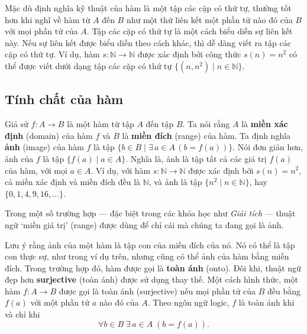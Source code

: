 Mặc dù định nghĩa kỹ thuật của hàm là một tập các cặp có thứ tự, thường tốt hơn khi nghĩ về hàm từ $A$ đến $B$ như một thứ liên kết một phần tử nào đó của $B$ với mọi phần tử của $A$. Tập các cặp có thứ tự là một cách biểu diễn sự liên kết này. Nếu sự liên kết được biểu diễn theo cách khác, thì dễ dàng viết ra tập các cặp có thứ tự. Ví dụ, hàm $s\colon \mathbb{N} \to \mathbb{N}$ được xác định bởi công thức $s(n) = n^2$ có thể được viết dưới dạng tập các cặp có thứ tự $\{(n,n^2) \mid n \in \mathbb{N}\}$.

\subsection{Tính chất của hàm}

Giả sử $f\colon A \to B$ là một hàm từ tập $A$ đến tập $B$. Ta nói rằng $A$ là \textbf{miền xác định} (domain) của hàm $f$ và $B$ là \textbf{miền đích} (range) của hàm. Ta định nghĩa \textbf{ảnh} (image) của hàm $f$ là tập $\{b \in B \mid \exists\, a \in A\, (b = f(a))\}$. Nói đơn giản hơn, ảnh của $f$ là tập $\{f(a) \mid a \in A\}$. Nghĩa là, ảnh là tập tất cả các giá trị $f(a)$ của hàm, với mọi $a \in A$. Ví dụ, với hàm $s\colon \mathbb{N} \to \mathbb{N}$ được xác định bởi $s(n) = n^2$, cả miền xác định và miền đích đều là $\mathbb{N}$, và ảnh là tập $\{n^2 \mid n \in \mathbb{N}\}$, hay $\{0, 1, 4, 9, 16, \ldots\}$.

\begin{infobox}
Trong một số trường hợp --- đặc biệt trong các khóa học như \emph{Giải tích} --- thuật ngữ `miền giá trị' (range) được dùng để chỉ cái mà chúng ta đang gọi là ảnh.
\end{infobox}

Lưu ý rằng ảnh của một hàm là tập con của miền đích của nó. Nó có thể là tập con thực sự, như trong ví dụ trên, nhưng cũng có thể ảnh của hàm bằng miền đích. Trong trường hợp đó, hàm được gọi là \textbf{toàn ánh} (onto). Đôi khi, thuật ngữ đẹp hơn \textbf{surjective} (toàn ánh) được sử dụng thay thế. Một cách hình thức, một hàm $f\colon A \to B$ được gọi là toàn ánh (surjective) nếu mọi phần tử của $B$ đều bằng $f(a)$ với một phần tử $a$ nào đó của $A$. Theo ngôn ngữ logic, $f$ là toàn ánh khi và chỉ khi
\[
\forall b \in B\; \exists\, a \in A\; (b = f(a)).
\]

